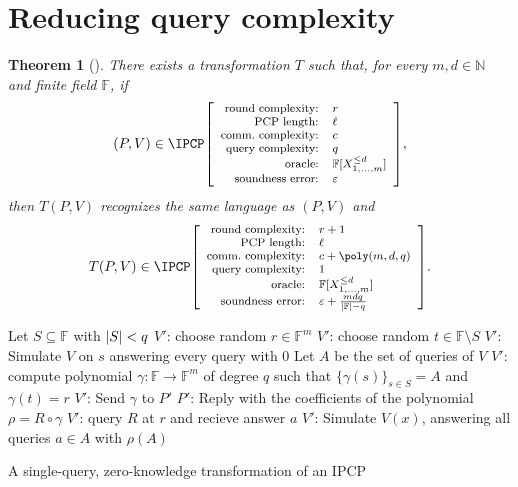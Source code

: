 \documentclass[english,12pt]{reedthesis}
\theoremstyle{plain}
\newtheorem{thm}{Theorem}[section]
\theoremstyle{definition}
\theoremstyle{remark}
\DeclarePairedDelimiter{\abs}{\lvert}{\rvert}
\newcommand{\ldipcp}[6]{%
  \ensuremath%
  \mleft[{\footnotesize\begin{array}{r l}
    \text{round complexity:} & #1 \\
    \text{PCP length:} & #2 \\
    \text{comm.\ complexity:} & #3 \\
    \text{query complexity:} & #4 \\
    \text{oracle:} & #5 \\
    \text{soundness error:} & #6
  \end{array}}\mright]%
}
\begin{document}
\section{Reducing query complexity}\label{sec:reduce-queries}

\begin{thm}[{\cite[Prop.\ 9.2]{CFGS22}}]\label{thm:ipcp-one-query}
  There exists a transformation $T$ such that, for every $m, d \in \mathbb{N}$ and finite
  field $\mathbb{F}$, if
  \begin{equation*}
    (P, V) \in \IPCP\ldipcp{r}{\ell}{c}{q}{\mathbb{F}[X_{1, \ldots, m}^{\le d}]}{\varepsilon},
  \end{equation*}
  then $T(P, V)$ recognizes the same language as $(P, V)$ and
  \begin{equation*}
    T(P, V) \in \IPCP\ldipcp{r+1}{\ell}{c+\poly(m,d,q)}{1}{\mathbb{F}[X_{1, \ldots, m}^{\le d}]}{\varepsilon+\frac{mdq}{\abs{\mathbb{F}}-q}}.
  \end{equation*}
\end{thm}

\begin{algorithm}[htbp]
  Let $S \subseteq \mathbb{F}$ with $\abs{S} < q$\;
  $V'$: choose random $r \in \mathbb{F}^{m}$\;
  $V'$: choose random $t \in \mathbb{F} \setminus S$\;
  $V'$: Simulate $V$ on $s$ answering every query with
  $0$\;
  Let $A$ be the set of queries of $V$\;
  $V'$: compute polynomial $\gamma: \mathbb{F} \rightarrow \mathbb{F}^{m}$ of degree $q$ such
  that $\{\gamma(s)\}_{s \in S} = A$ and $\gamma(t) = r$\;
  $V'$: Send $\gamma$ to $P'$\;
  $P'$: Reply with the coefficients of the polynomial $\rho = R \circ \gamma$\;
  $V'$: query $R$ at $r$ and recieve answer $a$\;
  $V'$: Simulate $V(x)$, answering all queries $a \in A$ with
  $\rho(A)$\;
  \;
  \caption{A single-query, zero-knowledge transformation of an
    IPCP~\cite[Construction 4]{CFGS22}}\label{alg:single-query}
\end{algorithm}
\end{document}
